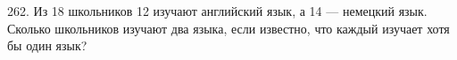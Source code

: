 262. Из 18 школьников 12 изучают английский язык, а 14 --- немецкий язык. Сколько школьников изучают два языка, если известно, что каждый изучает хотя бы один язык?\\
